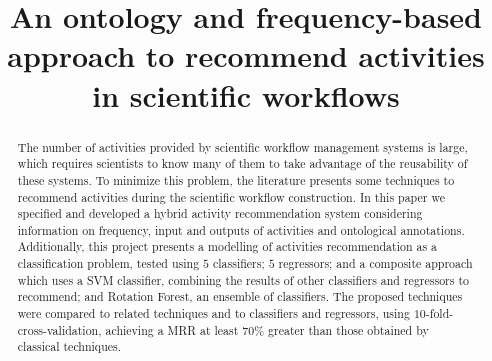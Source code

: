 \documentclass{doublecol-new}
\theoremstyle{TH}{
\newtheorem{lemma}{Lemma}
\newtheorem{theorem}[lemma]{Theorem}
\newtheorem{corrolary}[lemma]{Corrolary}
\newtheorem{conjecture}[lemma]{Conjecture}
\newtheorem{proposition}[lemma]{Proposition}
\newtheorem{claim}[lemma]{Claim}
\newtheorem{stheorem}[lemma]{Wrong Theorem}
\newtheorem{algorithm}{Algorithm}
}
\theoremstyle{THrm}{
\newtheorem{definition}{Definition}[section]
\newtheorem{question}{Question}[section]
\newtheorem{remark}{Remark}
\newtheorem{scheme}{Scheme}
}
\theoremstyle{THhit}{
\newtheorem{case}{Case}[section]
}
\begin{document}
%

\setcounter{page}{1}



%
%

\BottomCatch



\subtitle{}

\title{An ontology and frequency-based approach to recommend activities in scientific workflows}

%
%

%
%
%
%
%
%
%

\begin{abstract}
The number of activities provided by scientific workflow management systems is large,
which requires scientists to know many of them to take advantage of the reusability
of these systems. To minimize this problem, the literature presents some techniques to recommend activities during the scientific workflow construction. In this paper we specified and developed a hybrid activity recommendation system considering information on frequency, input and outputs of activities and ontological annotations. Additionally, this project presents a modelling of activities recommendation as a classification problem, tested using \(5\) classifiers; \(5\) regressors; and a composite approach which uses a SVM classifier, combining the results of other classifiers and
regressors to recommend; and Rotation Forest, an ensemble of classifiers. The proposed techniques were compared to related techniques and to classifiers and regressors, using \(10\)-fold-cross-validation, achieving a MRR at least \(70\%\) greater than those obtained by classical techniques.
\end{abstract}
\end{document}
